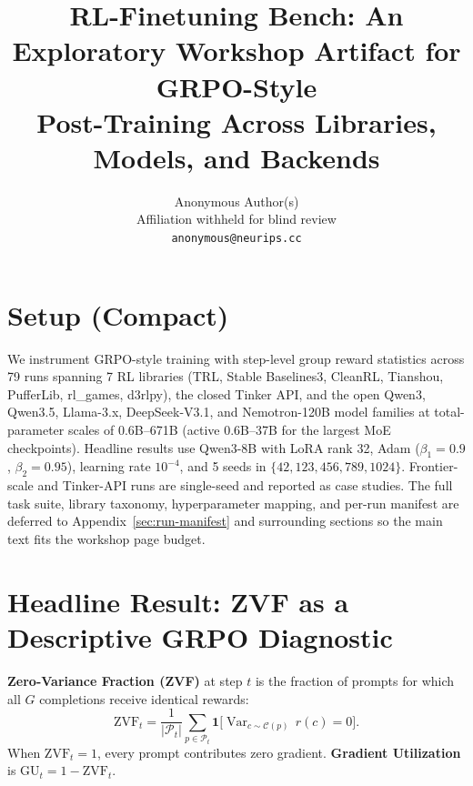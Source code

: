 \documentclass{article}
\title{RL-Finetuning Bench: An Exploratory Workshop Artifact for GRPO-Style\\
Post-Training Across Libraries, Models, and Backends}
\author{%
  Anonymous Author(s)\\
  Affiliation withheld for blind review\\
  \texttt{anonymous@neurips.cc}%
}
\begin{document}
\sloppy
{}
\hfuzz=2pt

\maketitle




\section{Setup (Compact)}
\label{sec:setup}

We instrument GRPO-style training with step-level group reward statistics
across 79 runs spanning 7 RL libraries (TRL, Stable Baselines3, CleanRL,
Tianshou, PufferLib, rl\_games, d3rlpy), the closed Tinker API, and the open
Qwen3, Qwen3.5, Llama-3.x, DeepSeek-V3.1, and Nemotron-120B model families at
total-parameter scales of 0.6B--671B (active 0.6B--37B for the largest MoE
checkpoints). Headline results use Qwen3-8B with LoRA rank 32, Adam
($\beta_1{=}0.9$, $\beta_2{=}0.95$), learning rate $10^{-4}$, and 5 seeds in
$\{42,123,456,789,1024\}$. Frontier-scale and Tinker-API runs are single-seed
and reported as case studies. The full task suite, library taxonomy,
hyperparameter mapping, and per-run manifest are deferred to
Appendix~\ref{sec:run-manifest} and surrounding sections so the main text fits
the workshop page budget.

\section{Headline Result: ZVF as a Descriptive GRPO Diagnostic}
\label{sec:zvf-analysis}

\textbf{Zero-Variance Fraction (ZVF)} at step $t$ is the fraction of prompts
for which all $G$ completions receive identical rewards:
\[
  \mathrm{ZVF}_t = \frac{1}{|\mathcal{P}_t|}\sum_{p \in \mathcal{P}_t}
  \mathbf{1}\bigl[\operatorname{Var}_{c \sim \mathcal{C}(p)}\,r(c) = 0\bigr].
\]
When $\mathrm{ZVF}_t = 1$, every prompt contributes zero gradient.
\textbf{Gradient Utilization} is $\mathrm{GU}_t = 1 - \mathrm{ZVF}_t$.
\end{document}
